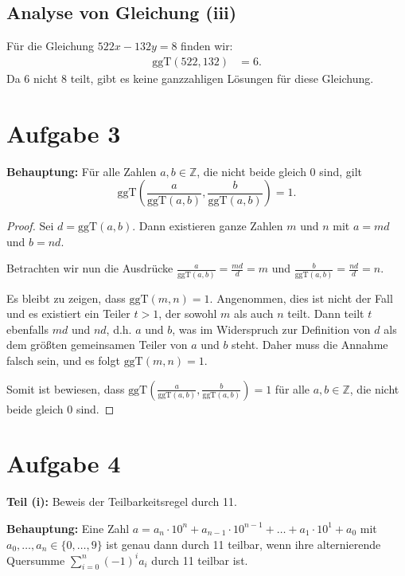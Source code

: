 \documentclass{article}
\begin{document}
\subsection*{Analyse von Gleichung (iii)}
Für die Gleichung \(522x - 132y = 8\) finden wir:
\begin{align*}
	\text{ggT}(522, 132) & = 6.
\end{align*}
Da \(6\) nicht \(8\) teilt, gibt es keine ganzzahligen Lösungen für diese Gleichung.

\section*{Aufgabe 3}

\textbf{Behauptung:} Für alle Zahlen \( a, b \in \mathbb{Z} \), die nicht beide gleich 0 sind, gilt
\[
	\text{ggT}\left( \frac{a}{\text{ggT}(a, b)}, \frac{b}{\text{ggT}(a, b)} \right) = 1.
\]

\begin{proof}
	Sei \( d = \text{ggT}(a, b) \). Dann existieren ganze Zahlen \( m \) und \( n \) mit \( a = md \) und \( b = nd \).

	Betrachten wir nun die Ausdrücke \( \frac{a}{\text{ggT}(a, b)} = \frac{md}{d} = m \) und \( \frac{b}{\text{ggT}(a, b)} = \frac{nd}{d} = n \).

	Es bleibt zu zeigen, dass \( \text{ggT}(m, n) = 1 \). Angenommen, dies ist nicht der Fall und es existiert ein Teiler \( t > 1 \), der sowohl \( m \) als auch \( n \) teilt. Dann teilt \( t \) ebenfalls \( md \) und \( nd \), d.h. \( a \) und \( b \), was im Widerspruch zur Definition von \( d \) als dem größten gemeinsamen Teiler von \( a \) und \( b \) steht. Daher muss die Annahme falsch sein, und es folgt \( \text{ggT}(m, n) = 1 \).

	Somit ist bewiesen, dass \( \text{ggT}\left( \frac{a}{\text{ggT}(a, b)}, \frac{b}{\text{ggT}(a, b)} \right) = 1 \) für alle \( a, b \in \mathbb{Z} \), die nicht beide gleich 0 sind.
\end{proof}

\section*{Aufgabe 4}

\textbf{Teil (i):} Beweis der Teilbarkeitsregel durch 11.

\textbf{Behauptung:} Eine Zahl \( a = a_n \cdot 10^n + a_{n-1} \cdot 10^{n-1} + \ldots + a_1 \cdot 10^1 + a_0 \) mit \( a_0, \ldots, a_n \in \{0, \ldots, 9\} \) ist genau dann durch 11 teilbar, wenn ihre alternierende Quersumme \( \sum_{i=0}^{n} (-1)^i a_i \) durch 11 teilbar ist.
\end{document}
